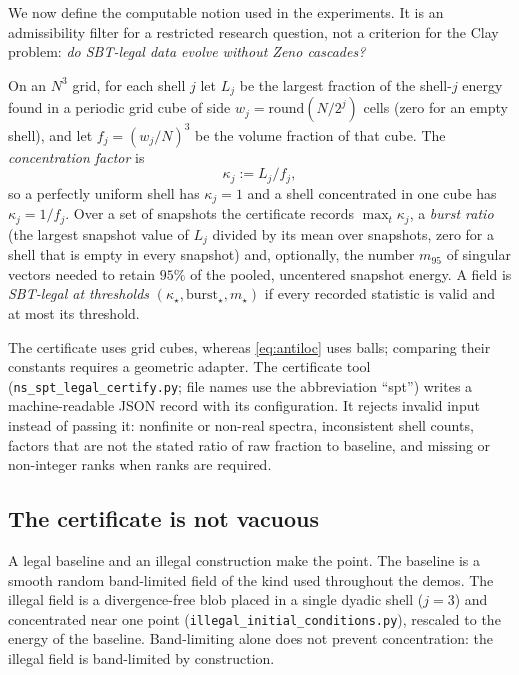 We now define the computable notion used in the experiments. It is an admissibility filter for a
restricted research question, not a criterion for the Clay problem: \emph{do SBT-legal data evolve
without Zeno cascades?}

\begin{definition}\label{def:spt-legal-cert}
On an $N^3$ grid, for each shell $j$ let $L_j$ be the largest fraction of the shell-$j$ energy found
in a periodic grid cube of side $w_j=\mathrm{round}(N/2^j)$ cells (zero for an empty shell), and let
$f_j=(w_j/N)^3$ be the volume fraction of that cube. The \emph{concentration factor} is
\[
\kappa_j:=L_j/f_j ,
\]
so a perfectly uniform shell has $\kappa_j=1$ and a shell concentrated in one cube has
$\kappa_j=1/f_j$. Over a set of snapshots the certificate records $\max_t\kappa_j$, a \emph{burst
ratio} (the largest snapshot value of $L_j$ divided by its mean over snapshots, zero for a shell
that is empty in every snapshot) and, optionally, the
number $m_{95}$ of singular vectors needed to retain $95\%$ of the pooled, uncentered snapshot
energy. A field is \emph{SBT-legal at thresholds} $(\kappa_\star,\mathrm{burst}_\star,m_\star)$ if
every recorded statistic is valid and at most its threshold.
\end{definition}

The certificate uses grid cubes, whereas \eqref{eq:antiloc} uses balls; comparing their constants
requires a geometric adapter. The certificate tool (\nolinkurl{ns_spt_legal_certify.py}; file names
use the abbreviation ``spt'') writes a machine-readable JSON record with its configuration. It
rejects invalid input instead of passing it: nonfinite or non-real spectra, inconsistent shell
counts, factors that are not the stated ratio of raw fraction to baseline, and missing or
non-integer ranks when ranks are required.

\subsection{The certificate is not vacuous}

A legal baseline and an illegal construction make the point. The baseline is a smooth random
band-limited field of the kind used throughout the demos. The illegal field is a divergence-free
blob placed in a single dyadic shell ($j=3$) and concentrated near one point
(\nolinkurl{illegal_initial_conditions.py}), rescaled to the energy of the baseline. Band-limiting alone does not prevent concentration: the
illegal field is band-limited by construction.

